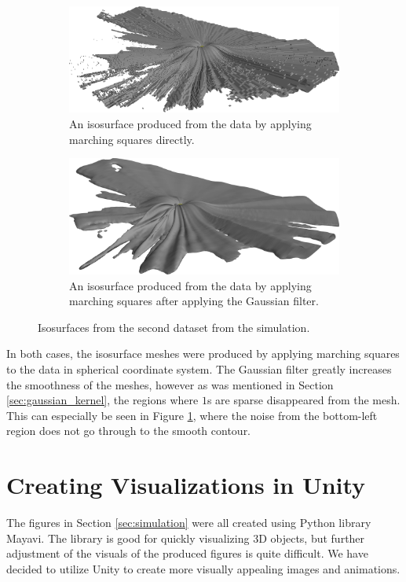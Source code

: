 \documentclass[a4paper,10pt]{report}
\begin{document}
\begin{figure}[H]
    \centering
    \begin{subfigure}{.49\textwidth}
        \includegraphics[width=\textwidth]{../images/3D/Dataset2.png}
    \caption{An isosurface produced from the data by applying marching squares directly.}
    \end{subfigure}
    \hfill
    \begin{subfigure}{.49\textwidth}
        \includegraphics[width=\textwidth]{../images/3D/Dataset2_Gaussian.png}
    \caption{An isosurface produced from the data by applying marching squares after applying the Gaussian filter.}
    \end{subfigure}
    \caption{Isosurfaces from the second dataset from the simulation.}
    \label{fig:Dataset2}
\end{figure}
In both cases, the isosurface meshes were produced by applying marching squares to the data in spherical coordinate system. The Gaussian filter greatly increases the smoothness of the meshes, however as was mentioned in Section \ref{sec:gaussian_kernel}, the regions where $1$s are sparse disappeared from the mesh. This can especially be seen in Figure \ref{fig:Dataset2}, where the noise from the bottom-left region does not go through to the smooth contour.

\chapter{Creating Visualizations in Unity}
The figures in Section \ref{sec:simulation} were all created using Python library Mayavi. The library is good for quickly visualizing 3D objects, but further adjustment of the visuals of the produced figures is quite difficult. We have decided to utilize Unity to create more visually appealing images and animations.
\end{document}
